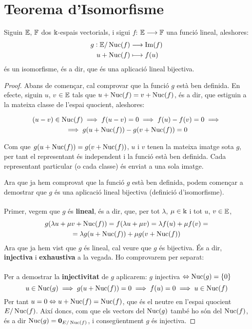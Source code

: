 \section{Teorema d'Isomorfisme}

Siguin $\mathbb{E}$, $\mathbb{F}$ dos $\Bbbk$-espais vectorials, i sigui $f$: $\mathbb{E} \longrightarrow \mathbb{F}$ una funció lineal, aleshores:
\[
\begin{aligned}
g: \mathbb{E}/\operatorname{Nuc}(f) & \longrightarrow \operatorname{Im}(f)\\
u + \operatorname{Nuc}(f) & \longmapsto f(u)\\
\end{aligned}
\]
és un isomorfisme, és a dir, que és una aplicació lineal bijectiva.
\\

\begin{proof}

Abans de començar, cal comprovar que la funció $g$ està ben definida. En efecte, siguin $u$, $v$ $\in \mathbb{E}$ tals que $u + \operatorname{Nuc}(f) = v + \operatorname{Nuc}(f)$, és a dir, que estiguin a la mateixa classe de l'espai quocient, aleshores:

\begin{gather*}
(u-v) \in \operatorname{Nuc}(f) \implies f(u-v) = 0 \implies f(u) - f(v) = 0 \implies \\
\implies g(u + \operatorname{Nuc}(f)) - g(v + \operatorname{Nuc}(f)) = 0
\end{gather*}

Com que $g(u + \operatorname{Nuc}(f)) = g(v + \operatorname{Nuc}(f))$, $u$ i $v$ tenen la mateixa imatge sota $g$, per tant el representant és independent i la funció està ben definida. Cada representant particular (o cada classe) és enviat a una sola imatge.


Ara que ja hem comprovat que la funció $g$ està ben definida, podem començar a demostrar que $g$ és una aplicació lineal bijectiva (definició d'isomorfisme). \\\\Primer, vegem que  $g$ és \textbf{lineal}, és a dir, que, per tot $\lambda$, $\mu \in \Bbbk$ i tot $u$, $v \in \mathbb{E}$, 
\begin{gather*}
g(\lambda u + \mu v + \operatorname{Nuc}(f))  = f(\lambda u + \mu v) = \lambda f(u) + \mu f(v) =\\
= \lambda g(u + \operatorname{Nuc}(f)) + \mu g(v + \operatorname{Nuc}(f))
\end{gather*}
Ara que ja hem vist que $g$ és lineal, cal veure que $g$ és bijectiva. És a dir, \textbf{injectiva} i \textbf{exhaustiva} a la vegada. Ho comprovarem per separat:
\\\\
Per a demostrar la \textbf{injectivitat} de $g$ aplicarem: $g$ injectiva $\Leftrightarrow \operatorname{Nuc}(g) = \{0\}$
\[
u \in \operatorname{Nuc}(g) \implies g(u + \operatorname{Nuc}(f)) = 0 \implies f(u) = 0 \implies u \in \operatorname{Nuc}(f)
\]
Per tant $u = 0 \Leftrightarrow u + \operatorname{Nuc}(f) = \operatorname{Nuc}(f)$, que és el neutre en l'espai quocient $E/\operatorname{Nuc}(f)$. Així doncs, com que els vectors del $\operatorname{Nuc}(g)$ també ho són del $\operatorname{Nuc}(f)$, és a dir $\operatorname{Nuc}(g) = {\textbf{0}_{E/\operatorname{Nuc}(f)}}$, i consegüentment $g$ és injectiva.



\end{proof}
